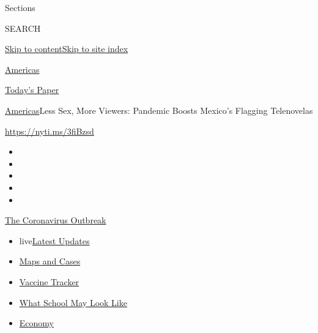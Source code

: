 Sections

SEARCH

\protect\hyperlink{site-content}{Skip to
content}\protect\hyperlink{site-index}{Skip to site index}

\href{https://www.nytimes3xbfgragh.onion/section/world/americas}{Americas}

\href{https://myaccount.nytimes3xbfgragh.onion/auth/login?response_type=cookie\&client_id=vi}{}

\href{https://www.nytimes3xbfgragh.onion/section/todayspaper}{Today's
Paper}

\href{/section/world/americas}{Americas}\textbar{}Less Sex, More
Viewers: Pandemic Boosts Mexico's Flagging Telenovelas

\url{https://nyti.ms/3fiBzsd}

\begin{itemize}
\item
\item
\item
\item
\item
\end{itemize}

\href{https://www.nytimes3xbfgragh.onion/news-event/coronavirus?action=click\&pgtype=Article\&state=default\&region=TOP_BANNER\&context=storylines_menu}{The
Coronavirus Outbreak}

\begin{itemize}
\tightlist
\item
  live\href{https://www.nytimes3xbfgragh.onion/2020/08/02/world/coronavirus-updates.html?action=click\&pgtype=Article\&state=default\&region=TOP_BANNER\&context=storylines_menu}{Latest
  Updates}
\item
  \href{https://www.nytimes3xbfgragh.onion/interactive/2020/us/coronavirus-us-cases.html?action=click\&pgtype=Article\&state=default\&region=TOP_BANNER\&context=storylines_menu}{Maps
  and Cases}
\item
  \href{https://www.nytimes3xbfgragh.onion/interactive/2020/science/coronavirus-vaccine-tracker.html?action=click\&pgtype=Article\&state=default\&region=TOP_BANNER\&context=storylines_menu}{Vaccine
  Tracker}
\item
  \href{https://www.nytimes3xbfgragh.onion/interactive/2020/07/29/us/schools-reopening-coronavirus.html?action=click\&pgtype=Article\&state=default\&region=TOP_BANNER\&context=storylines_menu}{What
  School May Look Like}
\item
  \href{https://www.nytimes3xbfgragh.onion/live/2020/07/31/business/stock-market-today-coronavirus?action=click\&pgtype=Article\&state=default\&region=TOP_BANNER\&context=storylines_menu}{Economy}
\end{itemize}

